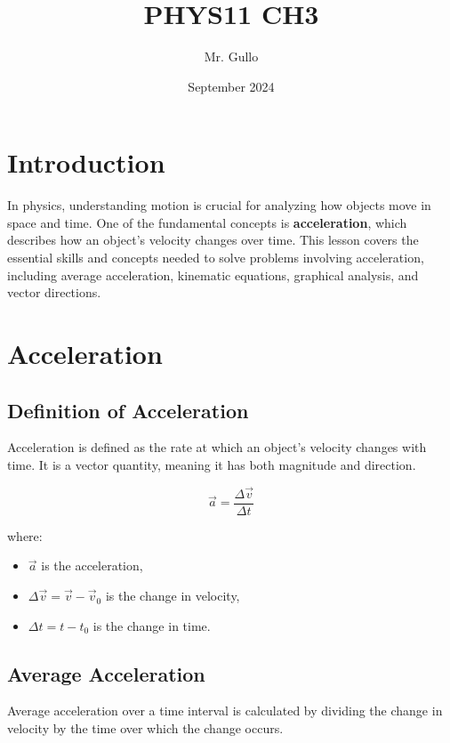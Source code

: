 \documentclass{article}
\title{PHYS11 CH3}
\author{Mr. Gullo}
\date{September 2024}
\begin{document}
\maketitle

\section{Introduction}

In physics, understanding motion is crucial for analyzing how objects move in space and time. One of the fundamental concepts is \textbf{acceleration}, which describes how an object's velocity changes over time. This lesson covers the essential skills and concepts needed to solve problems involving acceleration, including average acceleration, kinematic equations, graphical analysis, and vector directions.

\section{Acceleration}

\subsection{Definition of Acceleration}

Acceleration is defined as the rate at which an object's velocity changes with time. It is a vector quantity, meaning it has both magnitude and direction.

\begin{equation}
\vec{a} = \frac{\Delta \vec{v}}{\Delta t}
\end{equation}

where:
\begin{itemize}
    \item \( \vec{a} \) is the acceleration,
    \item \( \Delta \vec{v} = \vec{v} - \vec{v}_0 \) is the change in velocity,
    \item \( \Delta t = t - t_0 \) is the change in time.
\end{itemize}

\subsection{Average Acceleration}

Average acceleration over a time interval is calculated by dividing the change in velocity by the time over which the change occurs.
\end{document}

